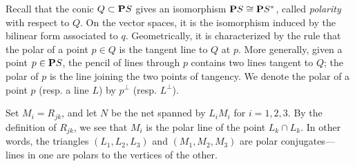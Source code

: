 \documentclass[11pt,reqno]{amsart}
\theoremstyle{plain}
\theoremstyle{definition}
\theoremstyle{remark}
\numberwithin{equation}{section}
\numberwithin{equation}{section}
\begin{document}
Recall that the conic $Q \subset \P S$ gives an isomorphism $\P S \cong \P S^*$, called \emph{polarity} with respect to $Q$.
On the vector spaces, it is the isomorphism induced by the bilinear form associated to $q$.
Geometrically, it is characterized by the rule that the polar of a point $p \in Q$ is the tangent line to $Q$ at $p$.
More generally, given a point $p \in \P S$, the pencil of lines through $p$ contains two lines tangent to $Q$; the polar of $p$ is the line joining the two points of tangency.
We denote the polar of a point $p$ (resp. a line $L$) by $p^\perp$ (resp. $L^\perp$).

Set $M_i = R_{jk}$, and let $N$ be the net spanned by $L_iM_i$ for $i = 1, 2, 3$.
By the definition of $R_{jk}$, we see that $M_i$ is the polar line of the point $L_k \cap L_k$.
In other words, the triangles $(L_1, L_2, L_3)$ and $(M_1, M_2, M_3)$ are polar conjugates---lines in one are polars to the vertices of the other.
\end{document}
